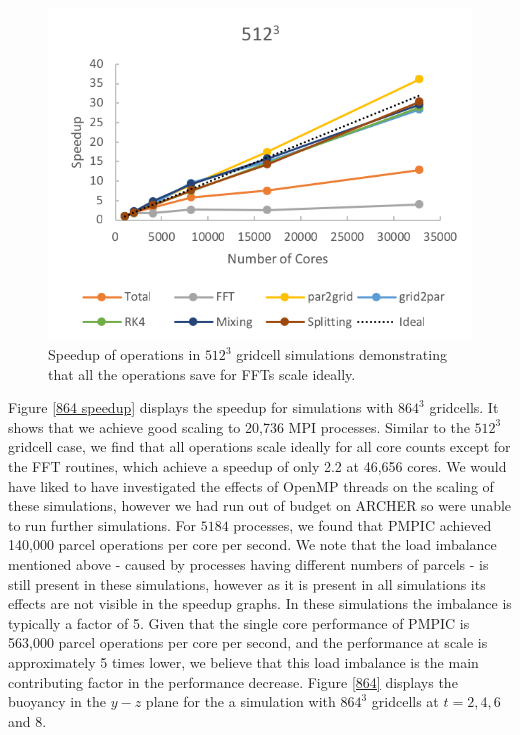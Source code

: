 \documentclass{article}
\begin{document}
\begin{figure}
  \begin{center}
    \includegraphics{pmpic_images/512ops.png}
  \end{center}
  \caption{Speedup of operations in $512^3$ gridcell simulations demonstrating that all the operations save for FFTs scale ideally.}
  \label{512 op}
\end{figure}

Figure \ref{864 speedup} displays the speedup for simulations with $864^3$ gridcells. It shows that we achieve good scaling to 20,736 MPI processes. Similar to the $512^3$ gridcell case, we find that all operations scale ideally for all core counts except for the FFT routines, which achieve a speedup of only 2.2 at 46,656 cores. We would have liked to have investigated the effects of OpenMP threads on the scaling of these simulations, however we had run out of budget on ARCHER so were unable to run further simulations. For $5184$ processes, we found that PMPIC achieved 140,000 parcel operations per core per second. We note that the load imbalance mentioned above - caused by processes having different numbers of parcels - is still present in these simulations, however as it is present in all simulations its effects are not visible in the speedup graphs. In these simulations the imbalance is typically a factor of 5. Given that the single core performance of PMPIC is 563,000 parcel operations per core per second, and the performance at scale is approximately 5 times lower, we believe that this load imbalance is the main contributing factor in the performance decrease. Figure \ref{864} displays the buoyancy in the $y-z$ plane for the a simulation with $864^3$ gridcells at $t=2, 4, 6$ and $8$.
\end{document}
